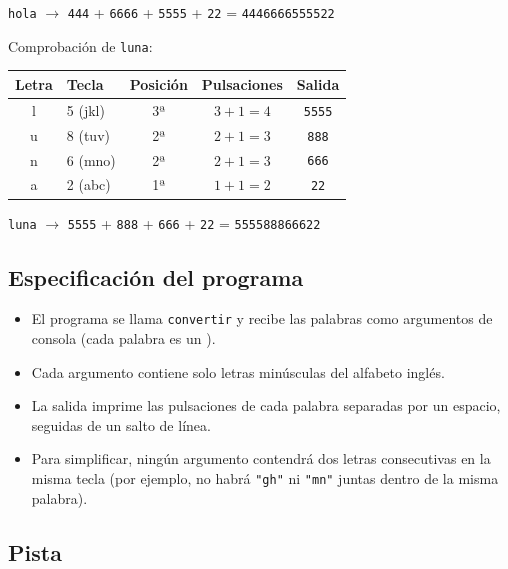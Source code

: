 \documentclass[12pt, oneside]{article}
\begin{document}
\begin{center}
  \texttt{hola} $\longrightarrow$ \texttt{444} + \texttt{6666} +
  \texttt{5555} + \texttt{22} = \texttt{4446666555522}
\end{center}

Comprobación de \texttt{luna}:

\begin{center}
\begin{tabular}{clccc}
  \toprule
  \textbf{Letra} & \textbf{Tecla} & \textbf{Posición} & \textbf{Pulsaciones} & \textbf{Salida} \\
  \midrule
  l & 5 (jkl) & 3ª & $3+1=4$ & \texttt{5555} \\
  u & 8 (tuv) & 2ª & $2+1=3$ & \texttt{888} \\
  n & 6 (mno) & 2ª & $2+1=3$ & \texttt{666} \\
  a & 2 (abc) & 1ª & $1+1=2$ & \texttt{22} \\
  \bottomrule
\end{tabular}
\end{center}

\begin{center}
  \texttt{luna} $\longrightarrow$ \texttt{5555} + \texttt{888} +
  \texttt{666} + \texttt{22} = \texttt{555588866622}
\end{center}

\subsection*{Especificación del programa}

\begin{itemize}
  \item El programa se llama \texttt{convertir} y recibe las palabras
        como argumentos de consola (cada palabra es un ).
  \item Cada argumento contiene solo letras minúsculas del alfabeto inglés.
  \item La salida imprime las pulsaciones de cada palabra separadas por
        un espacio, seguidas de un salto de línea.
  \item Para simplificar, ningún argumento contendrá dos letras
        consecutivas en la misma tecla (por ejemplo, no habrá
        \texttt{"gh"} ni \texttt{"mn"} juntas dentro de la misma palabra).
\end{itemize}

\subsection*{Pista}
\end{document}
